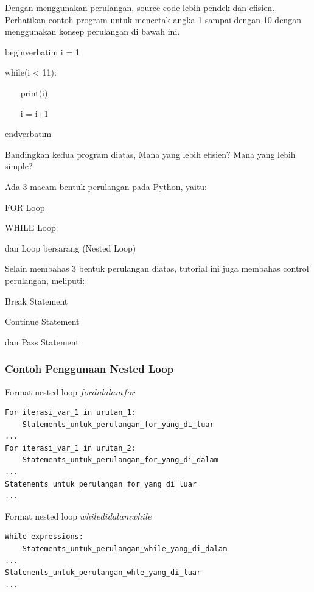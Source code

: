 Dengan menggunakan perulangan, source code lebih pendek dan efisien. Perhatikan contoh program untuk mencetak angka 1 sampai dengan 10 dengan menggunakan konsep perulangan di bawah ini.\vspace{\baselineskip}
\vspace{\baselineskip}
 \par
\vspace{12pt}

begin{verbatim}
i = 1 \par
while(i < 11): \par
~~~ print(i) \par
~~~ i = i+1 \par
end{verbatim}
\vspace{\baselineskip}

Bandingkan kedua program diatas, Mana yang lebih efisien? Mana yang lebih simple?\vspace{\baselineskip}
\vspace{\baselineskip}

Ada 3 macam bentuk perulangan pada Python, yaitu: \par
FOR Loop \par
WHILE Loop \par
dan Loop bersarang (Nested Loop) \par
\vspace{\baselineskip}

Selain membahas 3 bentuk perulangan diatas, tutorial ini juga membahas control perulangan, meliputi: \par
Break Statement \par
Continue Statement \par
dan Pass Statement \par
\vspace{\baselineskip}
\vspace{12pt}

\subsubsection{Contoh Penggunaan Nested Loop}
Format nested loop \(for di dalam for\)
\begin{verbatim}
For iterasi_var_1 in urutan_1:
	Statements_untuk_perulangan_for_yang_di_luar
...
For iterasi_var_1 in urutan_2:
	Statements_untuk_perulangan_for_yang_di_dalam
...
Statements_untuk_perulangan_for_yang_di_luar
...
\end{verbatim}

Format nested loop \(while di dalam while\)
\begin{verbatim}
While expressions:
	Statements_untuk_perulangan_while_yang_di_dalam
...
Statements_untuk_perulangan_whle_yang_di_luar
...
\end{verbatim}

